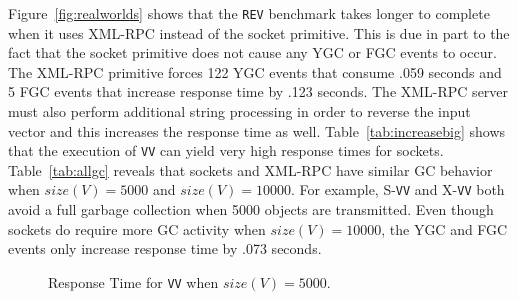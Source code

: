 \documentclass{sig-alternate}
\begin{document}
Figure~\ref{fig:realworlds} shows that the {\tt REV} benchmark takes
longer to complete when it uses XML-RPC instead of the socket
primitive.  This is due in part to the fact that the socket primitive
does not cause any YGC or FGC events to occur.  The XML-RPC primitive
forces 122 YGC events that consume .059 seconds and 5 FGC events that
increase response time by .123 seconds.  The XML-RPC server must also
perform additional string processing in order to reverse the input
vector and this increases the response time as well.
Table~\ref{tab:increasebig} shows that the execution of {\tt VV} can
yield very high response times for sockets.  Table~\ref{tab:allgc}
reveals that sockets and XML-RPC have similar GC behavior when
$size(V)=5000$ and $size(V)=10000$.  For example, S-{\tt VV} and
X-{\tt VV} both avoid a full garbage collection when 5000 objects are
transmitted.  Even though sockets do require more GC activity when
$size(V)=10000$, the YGC and FGC events only increase response time by
.073 seconds.

\begin{figure}[t]
\centering
{}
\vspace*{-.1in}
\caption{Response Time for {\tt VV} when $size(V)=5000$.}
\label{fig:ecdf}
\vspace*{-.1in}
\end{figure}


\end{document}
